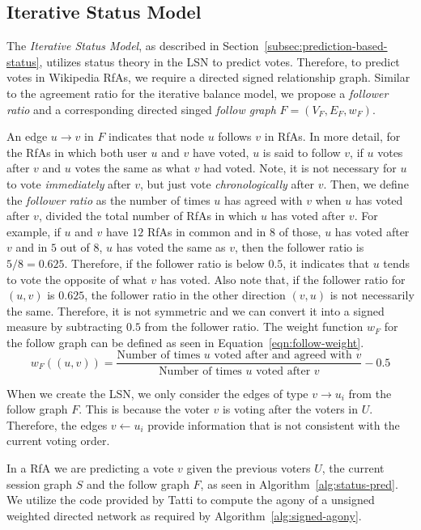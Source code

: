 \subsection{Iterative Status Model}
The \textit{Iterative Status Model}, as described in Section~\ref{subsec:prediction-based-status}, utilizes status theory in the LSN to predict votes.
Therefore, to predict votes in Wikipedia RfAs, we require a directed signed relationship graph.
Similar to the agreement ratio for the iterative balance model, we propose a \textit{follower ratio} and a corresponding directed singed \textit{follow graph} $F=(V_{F},E_{F},w_{F})$.

An edge $u \rightarrow v$ in $F$ indicates that node $u$ follows $v$ in RfAs.
In more detail, for the RfAs in which both user $u$ and $v$ have voted, $u$ is said to follow $v$, if $u$ votes after $v$ and $u$ votes the same as what $v$ had voted.
Note, it is not necessary for $u$ to vote \textit{immediately} after $v$, but just vote \textit{chronologically} after $v$.
Then, we define the \textit{follower ratio} as the number of times $u$ has agreed with $v$ when $u$ has voted after $v$, divided the total number of RfAs in which $u$ has voted after $v$.
For example, if $u$ and $v$ have $12$ RfAs in common and in $8$ of those, $u$ has voted after $v$  and in $5$ out of $8$, $u$ has voted the same as $v$, then the follower ratio is $5/8 = 0.625$.  
Therefore, if the follower ratio is below $0.5$, it indicates that $u$ tends to vote the opposite of what $v$ has voted.
Also note that, if the follower ratio for $(u,v)$ is $0.625$, the follower ratio in the other direction $(v,u)$ is not necessarily the same.
Therefore, it is not symmetric and we can convert it into a signed measure by subtracting $0.5$ from the follower ratio.
The weight function $w_{F}$ for the follow graph can be defined as seen in Equation~\eqref{eqn:follow-weight}. 
\begin{equation}
    \label{eqn:follow-weight}
    w_{F}((u,v)) = \frac{\text{Number of times } u \text{ voted after and agreed with } v }{\text{Number of times } u \text{ voted after } v} -0.5
\end{equation}

When we create the LSN, we only consider the edges of type $v \rightarrow u_{i}$ from the follow graph $F$.
This is because the voter $v$ is voting after the voters in $U$.
Therefore, the edges $v \leftarrow u_{i}$ provide information that is not consistent with the current voting order.

In a RfA we are predicting a vote $v$ given the previous voters $U$, the current session graph $S$ and the follow graph $F$, as seen in Algorithm~\ref{alg:status-pred}.
We utilize the code provided by Tatti \cite{tatti2017tiers} to compute the agony of a unsigned weighted directed network as required by Algorithm~\ref{alg:signed-agony}.


